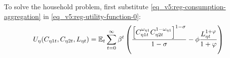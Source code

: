 \documentclass[../thesis.tex]{subfiles}
\begin{document}

To solve the household problem, first substitute \ref{eq_v5:reg-consumption-aggregation} in \ref{eq_v5:reg-utility-function-0}:
\begin{align}
	U_{\eta}(C_{\eta 1 t}, C_{\eta 2 t}, L_{\eta t}) = {\mathbb{E}_{t}} \sum_{t=0}^{\infty} \beta^t \left( \frac{\left[ C_{\eta 1 t}^{\omega_{\eta 1}} C_{\eta 2 t}^{1-\omega_{\eta 1}} \right]^{1-\sigma}}{1-\sigma} - \phi \frac{L_{\eta t}^{1+\varphi}}{1+\varphi} \right) \label{eq_v5:reg-utility-function}
\end{align}

\begin{comment}
	
Isolate $I_{\eta t}$ in \ref{eq_v5:reg-law-of-motion-for-capital} and substitute in \ref{eq_v5:reg-budget-constraint}:
\begin{align}
	& K_{\eta, t+1} = (1-\delta)K_{\eta t} + I_{\eta t} \implies I_{\eta t} = K_{\eta, t+1} - (1-\delta)K_{\eta t} \tag{\ref{eq_v5:reg-law-of-motion-for-capital}} \\
	\begin{split}
		& P_{1 t} C_{\eta 1 t} + P_{2 t} C_{\eta 2 t} + P_{\eta t} I_{\eta t} + B_{\eta t} = \\ & \quad = W_{\eta t} L_{\eta t} + R_{Kt} K_{\eta t} + (1 + R_{t-1}) B_{\eta,t-1} + \Pi_{\eta t} \implies
	\end{split} \tag{\ref{eq_v5:reg-budget-constraint}}
	\\
	\begin{split}
		& P_{1 t} C_{\eta 1 t} + P_{2 t} C_{\eta 2 t} + P_{\eta t} [ K_{\eta, t+1} - (1-\delta)K_{\eta t} ] + B_{\eta t} = \\ & \quad = W_{\eta t} L_{\eta t} + R_{Kt} K_{\eta t} + (1 + R_{t-1}) B_{\eta,t-1} + \Pi_{\eta t}
	\end{split} \label{eq_v5:reg-budget-constraint-2}
\end{align}

\end{comment}
\end{document}
